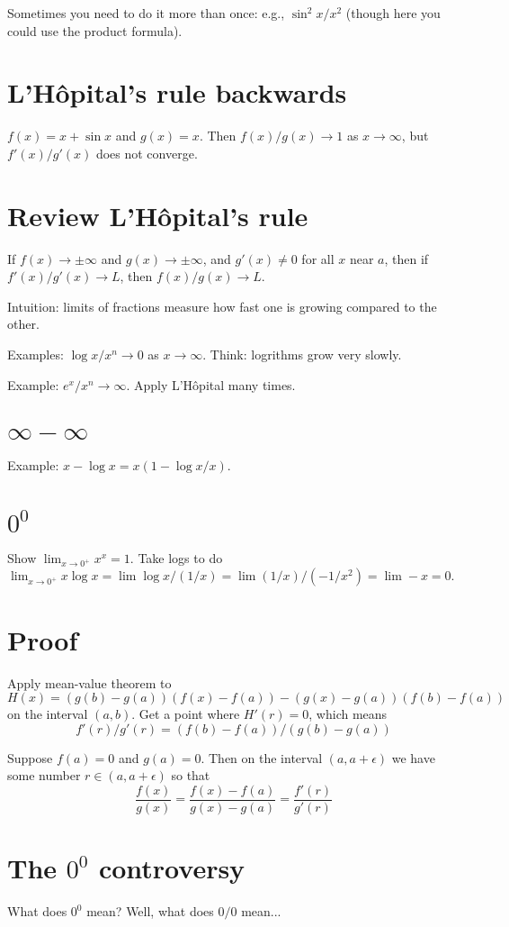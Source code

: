 \documentclass[12pt]{article}
\begin{document}
Sometimes you need to do it more than once: e.g., $\sin^2 x /x^2$ (though here you could use the product formula).

\section{L'H\^opital's rule backwards}

$f(x) = x + \sin x$ and $g(x) = x$.  Then $f(x)/g(x) \to 1$ as $x \to
\infty$, but $f'(x)/g'(x)$ does not converge.

\section{Review L'H\^opital's rule}

If $f(x) \to \pm \infty$ and $g(x) \to \pm \infty$, and $g'(x) \neq 0$
for all $x$ near $a$, then if $f'(x) / g'(x) \to L$, then $f(x)/g(x) \to
L$.

Intuition: limits of fractions measure how fast one is growing
compared to the other.

Examples: $\log x/x^n \to 0$ as $x \to \infty$.  Think: logrithms grow
very slowly.

Example: $e^x / x^n \to \infty$.  Apply L'H\^opital many times.

\section{$\infty - \infty$}

Example: $x - \log x = x(1 - \log x /x)$.

\section{$0^0$}

Show $\lim_{x \to 0^{+}} x^x = 1$.  Take logs to do $\lim_{x \to 0^{+}} x \log x = \lim \log x / (1/x) = \lim (1/x)/(-1/x^2) = \lim -x = 0$.

\section{Proof}

Apply mean-value theorem to
$$
H(x) = (g(b) - g(a)) ( f(x) - f(a) ) - (g(x) - g(a)) ( f(b) - f(a) )
$$
on the interval $(a,b)$.  Get a point where $H'(r) = 0$, which means
$$
f'(r)/g'(r) = (f(b) - f(a)) / (g(b) - g(a))
$$

Suppose $f(a) = 0$ and $g(a) = 0$.  Then on the interval $(a, a+\epsilon)$ we have some number $r \in (a,a+\epsilon)$ so that
$$
\frac{f(x)}{g(x)} = \frac{f(x) - f(a)}{g(x) - g(a)} = \frac{f'(r)}{g'(r)}
$$

\section{The $0^0$ controversy}

What does $0^0$ mean?  Well, what does $0/0$ mean...
\end{document}
